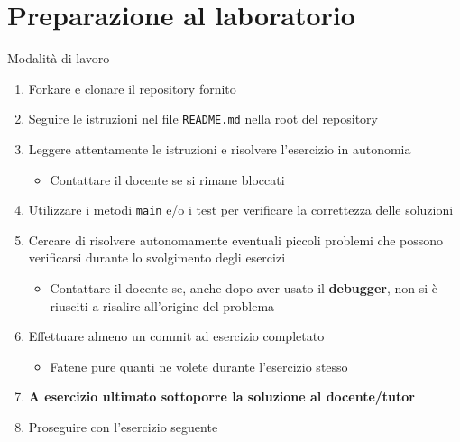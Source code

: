 \documentclass[xcolor=dvipsnames,presentation]{beamer}
\begin{document}
\section{Preparazione al laboratorio}

\begin{frame}{Modalità di lavoro}
	\begin{enumerate}
		\item Forkare e clonare il repository fornito
		\item Seguire le istruzioni nel file \texttt{README.md} nella root del repository
		\item Leggere attentamente le istruzioni e risolvere l'esercizio in autonomia
		\begin{itemize}
			\item Contattare il docente se si rimane bloccati
		\end{itemize}
		\item Utilizzare i metodi \texttt{main} e/o i test per verificare la correttezza delle soluzioni
		\item Cercare di risolvere autonomamente eventuali piccoli problemi che possono verificarsi durante lo svolgimento degli esercizi
		\begin{itemize}
			\item Contattare il docente se, anche dopo aver usato il \textbf{debugger}, non si è riusciti a risalire all'origine del problema
		\end{itemize}
		\item Effettuare almeno un commit ad esercizio completato
		\begin{itemize}
			\item Fatene pure quanti ne volete durante l'esercizio stesso
		\end{itemize}
		\item \textbf{A esercizio ultimato sottoporre la soluzione al docente/tutor}
		\item Proseguire con l'esercizio seguente
	\end{enumerate}
\end{frame}
\end{document}
